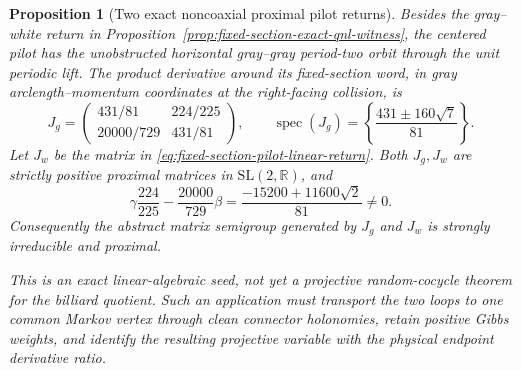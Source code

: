 \documentclass[11pt]{article}
\newtheorem{proposition}[theorem]{Proposition}
\begin{document}
\begin{proposition}[Two exact noncoaxial proximal pilot returns]
\label{prop:fixed-section-pilot-sip-seed}
Besides the gray--white return in
Proposition~\ref{prop:fixed-section-exact-qnl-witness}, the centered pilot
has the unobstructed horizontal gray--gray period-two orbit through the
unit periodic lift.  The product derivative around its fixed-section word,
in gray arclength--momentum coordinates at the right-facing collision, is
\begin{equation}
\label{eq:fixed-section-gray-gray-return}
 J_g=
 \begin{pmatrix}
  431/81&224/225\\[2pt]
  20000/729&431/81
 \end{pmatrix},
 \qquad
 \operatorname{spec}(J_g)
 =\left\{\frac{431\pm160\sqrt7}{81}\right\}.
\end{equation}
Let $J_w$ be the matrix in
\eqref{eq:fixed-section-pilot-linear-return}.  Both $J_g,J_w$ are strictly
positive proximal matrices in $\mathrm{SL}(2,\mathbb R)$, and
\begin{equation}
\label{eq:fixed-section-pilot-eigenline-obstruction}
 \gamma\frac{224}{225}
 -\frac{20000}{729}\beta
 =\frac{-15200+11600\sqrt2}{81}\ne0.
\end{equation}
Consequently the abstract matrix semigroup generated by $J_g$ and $J_w$ is
strongly irreducible and proximal.

This is an exact linear-algebraic seed, not yet a projective random-cocycle
theorem for the billiard quotient.  Such an application must transport the
two loops to one common Markov vertex through clean connector holonomies,
retain positive Gibbs weights, and identify the resulting projective
variable with the physical endpoint derivative ratio.
\end{proposition}
\end{document}
